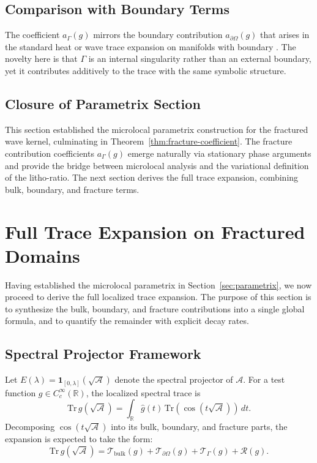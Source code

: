 \subsection{Comparison with Boundary Terms}

\begin{remark}
The coefficient $a_\Gamma(g)$ mirrors the boundary contribution $a_{\partial \Omega}(g)$
that arises in the standard heat or wave trace expansion on manifolds with boundary
\cite{Seeley1967, Ivrii1980}. The novelty here is that $\Gamma$ is an internal
singularity rather than an external boundary, yet it contributes additively to the
trace with the same symbolic structure.
\end{remark}

\subsection*{Closure of Parametrix Section}

This section established the microlocal parametrix construction for the fractured
wave kernel, culminating in Theorem~\ref{thm:fracture-coefficient}. The fracture
contribution coefficients $a_\Gamma(g)$ emerge naturally via stationary phase
arguments and provide the bridge between microlocal analysis and the variational
definition of the litho-ratio. The next section derives the full trace expansion,
combining bulk, boundary, and fracture terms.

\section{Full Trace Expansion on Fractured Domains}
\label{sec:full-trace}

Having established the microlocal parametrix in Section~\ref{sec:parametrix},
we now proceed to derive the full localized trace expansion. The purpose of
this section is to synthesize the bulk, boundary, and fracture contributions
into a single global formula, and to quantify the remainder with explicit
decay rates.

\subsection{Spectral Projector Framework}

Let $E(\lambda) = \mathbf{1}_{[0,\lambda]}(\sqrt{\mathcal{A}})$ denote the
spectral projector of $\mathcal{A}$. For a test function $g \in C_c^\infty(\mathbb{R})$,
the localized spectral trace is
\[
\mathrm{Tr}\, g(\sqrt{\mathcal{A}}) = \int_{\mathbb{R}} \hat g(t)\,
\mathrm{Tr}(\cos(t\sqrt{\mathcal{A}}))\, dt.
\]
Decomposing $\cos(t\sqrt{\mathcal{A}})$ into its bulk, boundary, and fracture
parts, the expansion is expected to take the form:
\[
\mathrm{Tr}\, g(\sqrt{\mathcal{A}}) =
\mathcal{T}_{\mathrm{bulk}}(g) +
\mathcal{T}_{\partial \Omega}(g) +
\mathcal{T}_\Gamma(g) + \mathcal{R}(g).
\]

